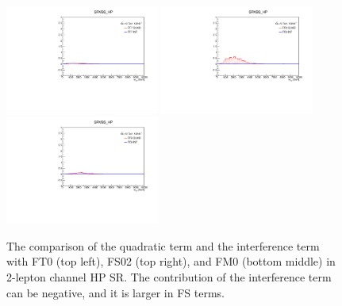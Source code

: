\begin{figure}[ht]
        \includegraphics[width=0.45\textwidth]{figures/aQGC/FT7_0ptag1pfat0pjet_0ptv_SRVBS_HP_MllJ.pdf}
        \includegraphics[width=0.45\textwidth]{figures/aQGC/FT8_0ptag1pfat0pjet_0ptv_SRVBS_HP_MllJ.pdf}
        \includegraphics[width=0.45\textwidth]{figures/aQGC/FT9_0ptag1pfat0pjet_0ptv_SRVBS_HP_MllJ.pdf}
        \caption{The comparison of the quadratic term and the interference term with FT0 (top left), FS02 (top right), and FM0 (bottom middle) in 2-lepton channel HP SR. The contribution of the interference term can be negative, and it is larger in FS terms. }
        \label{fig:quadintFT}
\end{figure}
